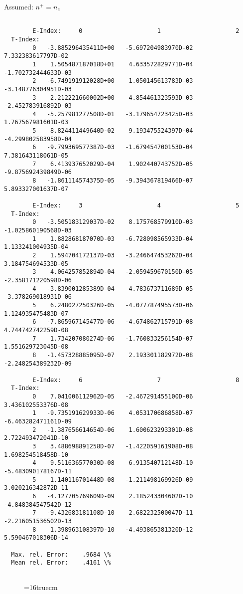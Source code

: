 \documentclass[12pt,dvipdfmx]{article}
\begin{document}
Assumed:  $n^+ = n_e$
\begin{small}\begin{verbatim}

        E-Index:     0                     1                     2
  T-Index:
        0   -3.885296435411D+00   -5.697204983970D-02    7.332383617797D-02
        1    1.505487187018D+01    4.633572829771D-04   -1.702732444633D-03
        2   -6.749191912028D+00    1.050145613783D-03   -3.148776304951D-03
        3    2.212221660002D+00    4.854461323593D-03   -2.452783916892D-03
        4   -5.257981277508D-01   -3.179654723425D-03    1.767567981601D-03
        5    8.824411449640D-02    9.193475524397D-04   -4.299802583958D-04
        6   -9.799369577387D-03   -1.679454700153D-04    7.381643118061D-05
        7    6.413937652029D-04    1.902440743752D-05   -9.875692439849D-06
        8   -1.861114574375D-05   -9.394367819466D-07    5.893327001637D-07

        E-Index:     3                     4                     5
  T-Index:
        0   -3.505183129037D-02    8.175768579910D-03   -1.025860190568D-03
        1    1.882868187070D-03   -6.728098565933D-04    1.133241004935D-04
        2    1.594704172137D-03   -3.246647453262D-04    3.184754694533D-05
        3    4.064257852894D-04   -2.059459670150D-05   -2.358171220598D-06
        4   -3.839001285389D-04    4.783673711689D-05   -3.378269018931D-06
        5    6.248027250326D-05   -4.077787495573D-06    1.124935475483D-07
        6   -7.865967145477D-06   -4.674862715791D-08    4.744742742259D-08
        7    1.734207080274D-06   -1.760833256154D-07    1.551629723045D-08
        8   -1.457328885095D-07    2.193301182972D-08   -2.248254389232D-09

        E-Index:     6                     7                     8
  T-Index:
        0    7.041006112962D-05   -2.467291455100D-06    3.436102553376D-08
        1   -9.735191629933D-06    4.053170686858D-07   -6.463282471161D-09
        2   -1.387656614654D-06    1.600623293301D-08    2.722493472041D-10
        3    3.488698891258D-07   -1.422059161908D-08    1.698254518458D-10
        4    9.511636577030D-08    6.913540712148D-10   -5.483090178167D-11
        5    1.140116701448D-08   -1.211498169926D-09    3.020216342872D-11
        6   -4.127705769609D-09    2.185243304602D-10   -4.848384547542D-12
        7   -9.432683181108D-10    2.682232500047D-11   -2.216051536502D-13
        8    1.398963108397D-10   -4.493865381320D-12    5.590467018306D-14

  Max. rel. Error:    .9684 \%
  Mean rel. Error:    .4161 \%


\end{verbatim}\end{small}
\begin{figure} \label{2.1.5_equil}
\epsfxsize=16truecm
\end{figure}
\newpage
\end{document}
